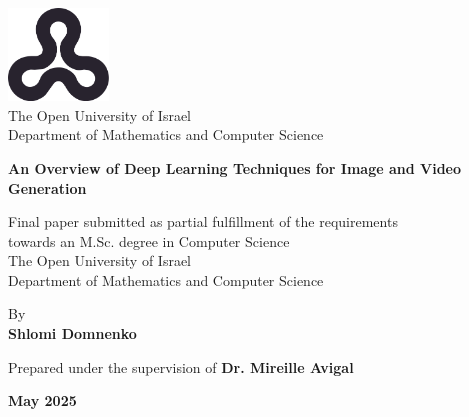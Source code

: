 \begin{titlepage}
    \begin{center}
        \vspace*{1cm}
        
        \includegraphics[width=0.2\textwidth]{images/ou_logo.png}\\
        The Open University of Israel\\
        Department of Mathematics and Computer Science
        
        \vspace{2cm}
        
        {\Large \textbf{An Overview of Deep Learning Techniques for Image and Video Generation}}
        \vspace{1.5cm}
        
        Final paper submitted as partial fulfillment of the requirements\\towards an M.Sc. degree in Computer Science\\
        The Open University of Israel\\
        Department of Mathematics and Computer Science
        
        \vspace{1cm}
        
        By \\
        \textbf{Shlomi Domnenko}
        
        \vspace{1cm}
        
        Prepared under the supervision of \textbf{Dr. Mireille Avigal}
        
        \vfill
        
        \textbf{May 2025}
    \end{center}
\end{titlepage}